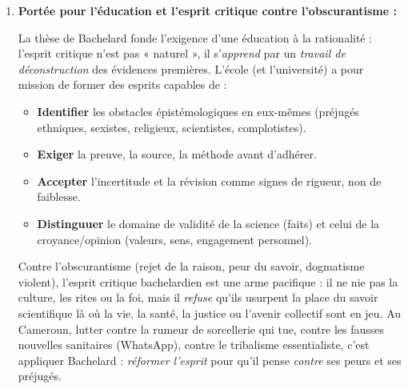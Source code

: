 \documentclass[11pt]{article}
\newcommand{\cle}[1]{{\popxbold\color{popdark}#1}}
\begin{document}
\begin{corrige}
\begin{enumerate}
\item \textbf{Portée pour l'éducation et l'esprit critique contre l'obscurantisme :}
\par La thèse de Bachelard fonde l'exigence d'une \cle{éducation à la rationalité} : l'esprit critique n'est pas « naturel », il s'\emph{apprend} par un \emph{travail de déconstruction} des évidences premières. L'école (et l'université) a pour mission de former des esprits capables de :
\begin{itemize}
\item \textbf{Identifier} les obstacles épistémologiques en eux-mêmes (préjugés ethniques, sexistes, religieux, scientistes, complotistes).
\item \textbf{Exiger} la \cle{preuve}, la \cle{source}, la \cle{méthode} avant d'adhérer.
\item \textbf{Accepter} l'\cle{incertitude} et la \cle{révision} comme signes de rigueur, non de faiblesse.
\item \textbf{Distinguuer} le \cle{domaine de validité} de la science (faits) et celui de la croyance/opinion (valeurs, sens, engagement personnel).
\end{itemize}
\par Contre l'\cle{obscurantisme} (rejet de la raison, peur du savoir, dogmatisme violent), l'esprit critique bachelardien est une \cle{arme pacifique} : il ne nie pas la culture, les rites ou la foi, mais il \emph{refuse} qu'ils usurpent la place du savoir scientifique là où la vie, la santé, la justice ou l'avenir collectif sont en jeu. Au Cameroun, lutter contre la rumeur de sorcellerie qui tue, contre les fausses nouvelles sanitaires (WhatsApp), contre le tribalisme essentialiste, c'est appliquer Bachelard : \emph{réformer l'esprit} pour qu'il pense \emph{contre} ses peurs et ses préjugés.
\end{enumerate}
\end{corrige}
\end{document}
